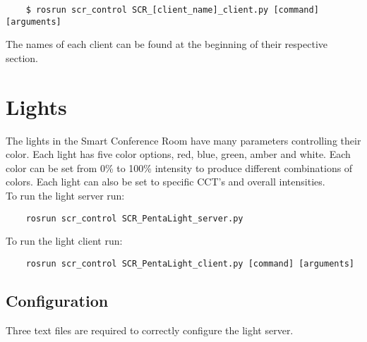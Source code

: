 \documentclass[twoside]{article}
\begin{document}
 	\begin{verbatim}
 	$ rosrun scr_control SCR_[client_name]_client.py [command] [arguments]
 	\end{verbatim}
 	The names of each client can be found at the beginning of their respective section.
 	

	\section{Lights}
	The lights in the Smart Conference Room have many parameters controlling their color. Each light has five color options, red, blue, green, amber and white. Each color can be set from 0\% to 100\% intensity to produce different combinations of colors. Each light can also be set to specific CCT's and overall intensities. \\
	
	To run the light server run:
	\begin{verbatim}
	rosrun scr_control SCR_PentaLight_server.py
	\end{verbatim}
	
	To run the light client run:
	\begin{verbatim}
	rosrun scr_control SCR_PentaLight_client.py [command] [arguments]
	\end{verbatim}	

	
	\subsection{Configuration}
	Three text files are required to correctly configure the light server.
	
\end{document}
